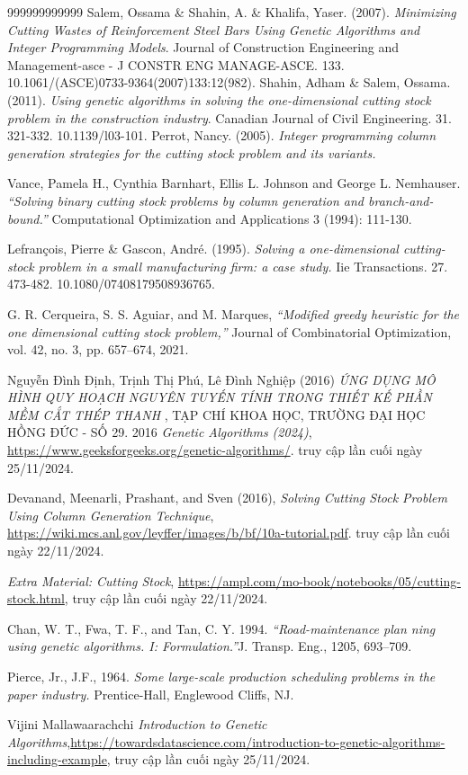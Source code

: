 \documentclass[a4paper]{article}
\begin{document}
\newpage
{}
\begin{thebibliography}{999999999999}
Salem, Ossama \& Shahin, A. \& Khalifa, Yaser. (2007). \textit{Minimizing Cutting Wastes of Reinforcement Steel Bars Using Genetic Algorithms and Integer Programming Models}. Journal of Construction Engineering and Management-asce - J CONSTR ENG MANAGE-ASCE. 133. 10.1061/(ASCE)0733-9364(2007)133:12(982).
Shahin, Adham \& Salem, Ossama. (2011). \textit{Using genetic algorithms in solving the one-dimensional cutting stock problem in the construction industry}. Canadian Journal of Civil Engineering. 31. 321-332. 10.1139/l03-101. 
Perrot, Nancy. (2005). \textit{Integer programming column generation strategies for the cutting stock problem and its variants.} 

Vance, Pamela H., Cynthia Barnhart, Ellis L. Johnson and George L. Nemhauser. \textit{“Solving binary cutting stock problems by column generation and branch-and-bound.”} Computational Optimization and Applications 3 (1994): 111-130.



Lefrançois, Pierre \& Gascon, André. (1995). \textit{Solving a one-dimensional cutting-stock problem in a small manufacturing firm: a case study.} Iie Transactions. 27. 473-482. 10.1080/07408179508936765. 

G. R. Cerqueira, S. S. Aguiar, and M. Marques, \textit{“Modified greedy heuristic for the one
dimensional cutting stock problem,”} Journal of Combinatorial Optimization, vol. 42, no. 3,
 pp. 657–674, 2021.
 
Nguyễn Đình Định, Trịnh Thị Phú, Lê Đình Nghiệp (2016) \textit{ỨNG DỤNG MÔ HÌNH QUY HOẠCH NGUYÊN TUYẾN TÍNH  TRONG THIẾT KẾ PHẦN MỀM CẮT THÉP THANH} , TẠP CHÍ KHOA HỌC, TRƯỜNG ĐẠI HỌC HỒNG ĐỨC - SỐ 29. 2016 
\emph{Genetic Algorithms (2024)}, \url{https://www.geeksforgeeks.org/genetic-algorithms/}. truy cập lần cuối ngày 25/11/2024.

 Devanand, Meenarli, Prashant, and Sven (2016), \textit{Solving Cutting Stock Problem Using Column Generation Technique}, \url{https://wiki.mcs.anl.gov/leyffer/images/b/bf/10a-tutorial.pdf}. truy cập lần cuối ngày 22/11/2024.
 
 \textit{Extra Material: Cutting Stock}, \url{https://ampl.com/mo-book/notebooks/05/cutting-stock.html}, truy cập lần cuối ngày 22/11/2024.
 
 Chan, W. T., Fwa, T. F., and Tan, C. Y. 1994. \textit{“Road-maintenance plan ning using genetic algorithms. I: Formulation.”}J. Transp. Eng., 1205, 693–709.
 
 Pierce, Jr., J.F., 1964.\textit{ Some large-scale production scheduling problems in the paper industry.} Prentice-Hall, Englewood Cliffs, NJ.

 Vijini Mallawaarachchi \textit{Introduction to Genetic Algorithms},\url{https://towardsdatascience.com/introduction-to-genetic-algorithms-including-example}, truy cập lần cuối ngày 25/11/2024.
 
\end{thebibliography}
\end{document}
